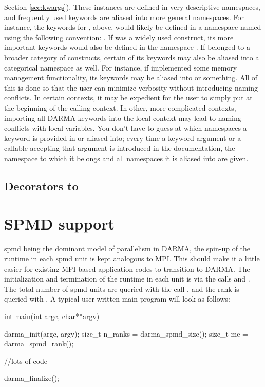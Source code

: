 Section \ref{sec:kwargs}).  These instances are defined in very descriptive namespaces,
and frequently used keywords are aliased into more general namespaces.  For instance, the keywords for , above, would likely be
defined in a namespace named using the following convention:
.
If  was a 
widely used construct, its more important keywords would also be defined in the namespace
.  If  belonged to a broader category of 
constructs, certain of its keywords may also be aliased into a categorical namespace
as well.  For instance, if  implemented some memory management functionality,
its keywords may be aliased into  or 
something.  All of this is done so that the user can minimize verbosity without introducing
naming conflicts.  In certain contexts, it may be expedient for the user to simply
put  at the beginning of the calling context.  In other,
more complicated contexts, importing all DARMA keywords into the local context may
lead to naming conflicts with local variables.  You don't have to guess at which namespaces
a keyword is provided in or aliased into; every time a keyword argument or a callable
accepting that argument is introduced in the documentation, the namespace to which 
it belongs and all namespaces it is aliased into are given.

\subsection{Decorators to }
\label{subsec:decorators}


\section{SPMD support}
\label{sec:spmd}
\gls{spmd} being the dominant model of parallelism in DARMA,  the spin-up of the
runtime in each \gls{spmd} unit is kept analogous to MPI. This should make it a little easier for existing MPI based application codes to transition 
to DARMA. The initialization and termination of the runtime in each unit is via the calls 
and . The total number of \gls{spmd} units are queried with the call ,
and the rank is queried with . A typical user written main program will look as follows:
\begin{CppCode}
int main(int argc, char**argv){

	darma_init(argc, argv);
	size_t n_ranks = darma_spmd_size();
	size_t me = darma_spmd_rank();

	//lots of code

	darma_finalize();
}
\end{CppCode}

